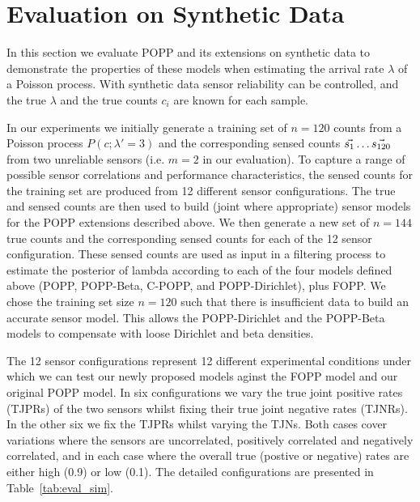 
\section{Evaluation on Synthetic Data}
\label{sec:evasim}

In this section we evaluate POPP and its extensions on synthetic data to demonstrate the properties of these models when estimating the arrival rate $\lambda$ of a Poisson process. With synthetic data sensor reliability can be controlled, and the true $\lambda$ and the true counts $c_i$ are known for each sample.


In our experiments we initially generate a training set of $n=120$ counts from a Poisson process $P(c ; \lambda'=3)$ and the corresponding sensed counts $\protect\vec{s_1} \ldots \protect\vec{s_{120}}$ from two unreliable sensors (i.e. $m=2$ in our evaluation). To capture a range of possible sensor correlations and performance characteristics, the sensed counts for the training set are produced from 12 different sensor configurations. The true and sensed counts are then used to build (joint where appropriate) sensor models for the POPP extensions described above. We then generate a new set of $n=144$ true counts and the corresponding sensed counts for each of the 12 sensor configuration. These sensed counts are used as input in a filtering process to estimate the posterior of lambda according to each of the four models defined above (POPP, POPP-Beta, C-POPP, and POPP-Dirichlet), plus FOPP.
% 
We chose the training set size $n=120$ such that there is insufficient data to build an accurate sensor model. This allows the POPP-Dirichlet and the POPP-Beta models to compensate with loose Dirichlet and beta densities. 

The 12 sensor configurations represent 12 different experimental conditions under which we can test our newly proposed models aginst the FOPP model and our original POPP model. In six configurations we vary the true joint positive rates (TJPRs) of the two sensors whilst fixing their true joint negative rates (TJNRs). In the other six we fix the TJPRs whilst varying the TJNs. Both cases cover variations where the sensors are uncorrelated, positively correlated and negatively correlated, and in each case where the overall true (postive or negative) rates are either high (0.9) or low (0.1). The detailed configurations are presented in Table~\ref{tab:eval_sim}. 



